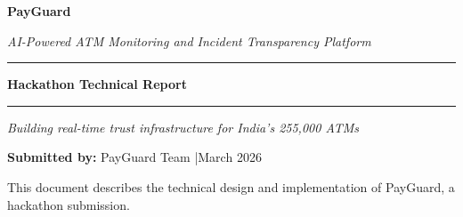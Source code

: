 \documentclass[11pt,a4paper]{article}
\begin{document}
\begin{titlepage}
\thispagestyle{empty}
\centering
\vspace*{2.5cm}

{\fontsize{52}{56}\selectfont\bfseries\textsf{PayGuard}}

\vspace{0.6cm}
{\large\itshape AI-Powered ATM Monitoring and Incident Transparency Platform}

\vspace{1.0cm}
\noindent\rule{\linewidth}{1.2pt}

\vspace{0.6cm}
{\Large\bfseries Hackathon Technical Report}

\vspace{0.6cm}
\noindent\rule{\linewidth}{1.2pt}

\vspace{1.0cm}
{\normalsize\itshape Building real-time trust infrastructure for India's 255,000 ATMs}

\vspace{2.5cm}

{\normalsize\textbf{Submitted by:} PayGuard Team \quad|\quad March 2026}

\vspace{1.5cm}


\vfill
{\small\color{gray} This document describes the technical design and implementation of PayGuard, a hackathon submission.}
\end{titlepage}

\newpage
\setcounter{page}{1}
\end{document}
